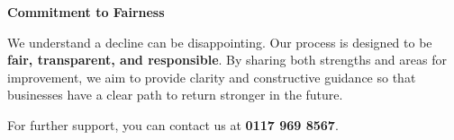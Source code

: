 \documentclass[a4paper,12pt]{article} %
\begin{document}
\bigskip
\noindent %
\makebox[\linewidth]{\rule{\textwidth}{0.4pt}} %
\bigskip

{\bf Commitment to Fairness}
\bigskip

\noindent We understand a decline can be disappointing. Our process is designed to be {\bf fair, transparent, and responsible}. By sharing both strengths and areas for improvement, we aim to provide clarity and constructive guidance so that businesses have a clear path to return stronger in the future.\smallskip

\noindent For further support, you can contact us at {\bf 0117 969 8567}.
\end{document}
